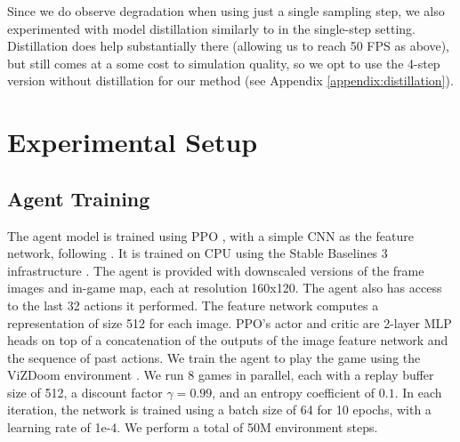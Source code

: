 \documentclass{article} %
\begin{document}
Since we do observe degradation when using just a single sampling step, we also experimented with model distillation similarly to \citep{yin2024onestep,wang2023prolificdreamer} in the single-step setting.
Distillation does help substantially there (allowing us to reach 50 FPS as above), but still comes at a some cost to simulation quality, so we opt to use the 4-step version without distillation for our method (see Appendix \ref{appendix:distillation}). %


\section{Experimental Setup}
\label{experimental_setup}

\subsection{Agent Training}
The agent model is trained using PPO \citep{SchulmanWDRK17ppo}, with a simple CNN as the feature network, following \cite{Mnih2015HumanlevelCT}. It is trained on CPU using the Stable Baselines 3 infrastructure \citep{stable-baselines3}.
The agent is provided with downscaled versions of the frame images and in-game map, each at resolution 160x120.
The agent also has access to the last 32 actions it performed.
The feature network computes a representation of size 512 for each image.
PPO's actor and critic are 2-layer MLP heads on top of a concatenation of the outputs of the image feature network and the sequence of past actions.
We train the agent to play the game using the ViZDoom environment \citep{Wydmuch2019ViZdoom}.
We run 8 games in parallel, each with a replay buffer size of 512, a discount factor $\gamma=0.99$, and an entropy coefficient of $0.1$. In each iteration, the network is trained using a batch size of 64 for 10 epochs, with a learning rate of 1e-4.
We perform a total of 50M environment steps.
\end{document}
